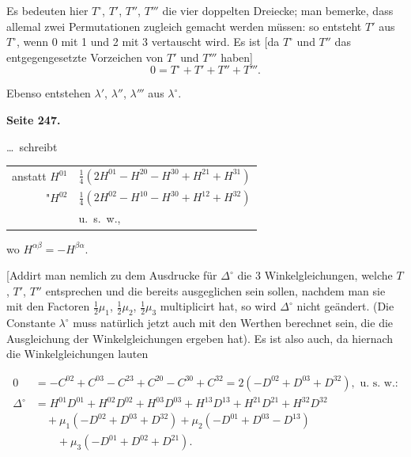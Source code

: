 \documentclass[12pt,a4paper]{article}
\theoremstyle{plain}
\theoremstyle{definition}
\theoremstyle{remark}
\begin{document}
Es bedeuten hier $T^{\circ}$, $T'$, $T''$, $T'''$ die vier doppelten Dreiecke; man bemerke, dass allemal zwei Permutationen zugleich gemacht werden müssen: so entsteht $T'$ aus $T^{\circ}$, wenn 0 mit 1 und 2 mit 3 vertauscht wird. Es ist [da $T^{\circ}$ und $T''$ das entgegengesetzte Vorzeichen von $T'$ und $T'''$ haben]
\[
0 = T^{\circ} + T' + T'' + T'''.
\]

Ebenso entstehen $\lambda'$, $\lambda''$, $\lambda'''$ aus $\lambda^{\circ}$.

\newpage
\textbf{Seite 247.}

\ldots\ schreibt

\begin{center}
\begin{tabular}{r@{\ldots\ldots\ }l}
anstatt $H^{01}$ & $\tfrac{1}{4}(2H^{01} - H^{20} - H^{30} + H^{21} + H^{31})$ \\
"\quad $H^{02}$ & $\tfrac{1}{4}(2H^{02} - H^{10} - H^{30} + H^{12} + H^{32})$ \\
& u.~s.~w.,
\end{tabular}
\end{center}

wo $H^{\alpha\beta} = -H^{\beta\alpha}$.

[Addirt man nemlich zu dem Ausdrucke für $\Delta^{\circ}$ die 3 Winkelgleichungen, welche $T$, $T'$, $T''$ entsprechen und die bereits ausgeglichen sein sollen, nachdem man sie mit den Factoren $\tfrac{1}{2}\mu_1$, $\tfrac{1}{2}\mu_2$, $\tfrac{1}{2}\mu_3$ multiplicirt hat, so wird $\Delta^{\circ}$ nicht geändert. (Die Constante $\lambda^{\circ}$ muss natürlich jetzt auch mit den Werthen berechnet sein, die die Ausgleichung der Winkelgleichungen ergeben hat). Es ist also auch, da hiernach die Winkelgleichungen lauten

\begin{align*}
0 &= -C^{02} + C^{03} - C^{23} + C^{20} - C^{30} + C^{32} = 2(-D^{02} + D^{03} + D^{32}), \text{ u.~s.~w.:} \\
\Delta^{\circ} &= H^{01}D^{01} + H^{02}D^{02} + H^{03}D^{03} + H^{13}D^{13} + H^{21}D^{21} + H^{32}D^{32} \\
&\quad + \mu_1(-D^{02} + D^{03} + D^{32}) + \mu_2(-D^{01} + D^{03} - D^{13}) \\
&\quad\quad + \mu_3(-D^{01} + D^{02} + D^{21}).
\end{align*}
\end{document}
